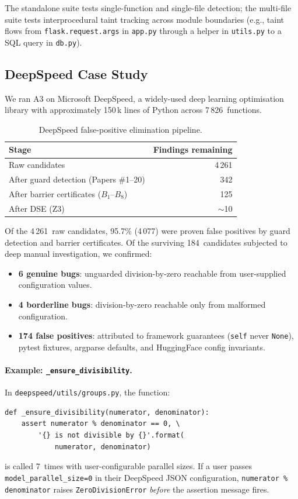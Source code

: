 \documentclass[sigconf,review,anonymous]{acmart}
\begin{document}
The standalone suite tests single-function and single-file detection; the multi-file suite tests interprocedural taint tracking across module boundaries (e.g., taint flows from \texttt{flask.request.args} in \texttt{app.py} through a helper in \texttt{utils.py} to a SQL query in \texttt{db.py}).

\subsection{DeepSpeed Case Study}

We ran \textsc{A3} on Microsoft DeepSpeed, a widely-used deep learning optimisation library with approximately 150\,k lines of Python across 7\,826~functions.

\begin{table}[t]
\caption{DeepSpeed false-positive elimination pipeline.}\label{tab:deepspeed}
\centering
\begin{tabular}{lr}
\toprule
\textbf{Stage} & \textbf{Findings remaining} \\
\midrule
Raw candidates & 4\,261 \\
After guard detection (Papers \#1--20) & 342 \\
After barrier certificates ($B_1$--$B_8$) & 125 \\
After DSE (Z3) & $\sim$10 \\
\bottomrule
\end{tabular}
\end{table}

Of the 4\,261~raw candidates, 95.7\% (4\,077) were proven false positives by guard detection and barrier certificates.
Of the surviving 184~candidates subjected to deep manual investigation, we confirmed:

\begin{itemize}
  \item \textbf{6 genuine bugs}: unguarded division-by-zero reachable from user-supplied configuration values.
  \item \textbf{4 borderline bugs}: division-by-zero reachable only from malformed configuration.
  \item \textbf{174 false positives}: attributed to framework guarantees (\texttt{self} never \texttt{None}), pytest fixtures, argparse defaults, and HuggingFace config invariants.
\end{itemize}

\paragraph{Example: \texttt{\_ensure\_divisibility}.}
In \texttt{deepspeed/utils/groups.py}, the function:
\begin{lstlisting}
def _ensure_divisibility(numerator, denominator):
    assert numerator % denominator == 0, \
        '{} is not divisible by {}'.format(
            numerator, denominator)
\end{lstlisting}
is called 7~times with user-configurable parallel sizes.
If a user passes \texttt{model\_parallel\_size=0} in their DeepSpeed JSON configuration, \texttt{numerator \% denominator} raises \texttt{ZeroDivisionError} \emph{before} the assertion message fires.
\end{document}
